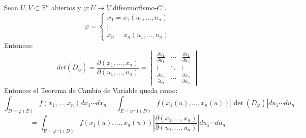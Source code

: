 \begin{observación}
Sean $U, V \subset \mathbb{R}^n$ abiertos y $\varphi: U \to V$ difeomorfismo-$C^1$.
$$\varphi = \begin{cases} x_1 = x_1(u_1, \ldots, u_n) \\ \vdots \\ x_n = x_n(u_1, \ldots, u_n) \end{cases}$$
Entonces:
$$det(D_{\varphi}) = \frac{\partial{(x_1, \ldots, x_n)}}{\partial{(u_1, \ldots, u_n)}} = \begin{vmatrix} \frac{\partial{x_1}}{\partial{u_1}} & \cdots & \frac{\partial{x_1}}{\partial{u_n}} \\ \vdots & \ddots & \vdots \\ \frac{\partial{x_n}}{\partial{u_1}} & \cdots & \frac{\partial{x_n}}{\partial{u_n}} \end{vmatrix}$$
Entonces el Teorema de Cambio de Variable queda como:
$$\int_{D = \varphi(E)} f(x_1, \ldots, x_n)dx_1 \cdots dx_n = \int_{E = \varphi^-1(D)} f(x_1(u), \ldots, x_n(u))|\det(D_{\varphi})|du_1 \cdots du_n =$$ $$
    = \int_{E = \varphi^-1(D)} f(x_1(u), \ldots, x_n(u))|\frac{\partial{(x_1, \ldots, x_n)}}{\partial{(u_1, \ldots, u_n)}}|du_1 \cdots du_n$$
\end{observación}

